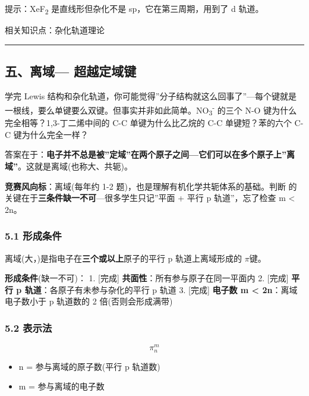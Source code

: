 \documentclass[a4paper,11pt]{ctexart}
\providecommand{\tightlist}{\setlength{\itemsep}{0pt}\setlength{\parskip}{0pt}}
\newcommand{\箭}{\ensuremath{\rightarrow}}
\newcommand{\左箭}{\ensuremath{\leftarrow}}
\newcommand{\上箭}{\ensuremath{\uparrow}}
\newcommand{\下箭}{\ensuremath{\downarrow}}
\newcommand{\衡}{\ensuremath{\rightleftharpoons}}
\newcommand{\双箭}{\ensuremath{\leftrightarrow}}
\newcommand{\约等于}{\ensuremath{\approx}}
\newcommand{\小于等于}{\ensuremath{\leq}}
\newcommand{\大于等于}{\ensuremath{\geq}}
\newcommand{\不等于}{\ensuremath{\neq}}
\newcommand{\西格马}{\ensuremath{\sigma}}
\newcommand{\派}{\ensuremath{\pi}}
\begin{document}
提示：XeF\textsubscript{2} 是直线形但杂化不是 sp，它在第三周期，用到了 d 轨道。

相关知识点：杂化轨道理论

\begin{center}\rule{0.5\linewidth}{0.5pt}\end{center}

\subsection{\texorpdfstring{五、离域 --- 超越定域键}{五、离域--- 超越定域键}}\label{ux4e94ux79bbux57df-ux8d85ux8d8aux5b9aux57dfux952e}

学完 Lewis 结构和杂化轨道，你可能觉得''分子结构就这么回事了''---每个键就是一根线，要么单键要么双键。但事实并非如此简单。NO\textsubscript{3}\textsuperscript{-} 的三个 N-O 键为什么完全相等？1,3-丁二烯中间的 C-C 单键为什么比乙烷的 C-C 单键短？苯的六个 C-C 键为什么完全一样？

答案在于：\textbf{电子并不总是被''定域''在两个原子之间---它们可以在多个原子上''离域''}。这就是离域(也称大、共轭)。

\textbf{竞赛风向标}：离域(每年约 1-2 题)，也是理解有机化学共轭体系的基础。判断  的关键在于\textbf{三条件缺一不可}---很多学生只记''平面 + 平行 p 轨道''，忘了检查 m \textless{} 2n。

\subsubsection{5.1 形成条件}\label{ux5f62ux6210ux6761ux4ef6}

离域(大，)是指电子在\textbf{三个或以上}原子的平行 p 轨道上离域形成的 \派 键。

\textbf{形成条件}(缺一不可)：
1. {[}完成{]} \textbf{共面性}：所有参与原子在同一平面内
2. {[}完成{]} \textbf{平行 p 轨道}：各原子有未参与杂化的平行 p 轨道
3. {[}完成{]} \textbf{电子数 m \textless{} 2n}：离域电子数小于 p 轨道数的 2 倍(否则会形成满带)

\subsubsection{\texorpdfstring{5.2  表示法}{5.2 表示法}}\label{ux8868ux793aux6cd5}

\[
\pi_n^m
\]

\begin{itemize}
\tightlist
\item
  n = 参与离域的原子数(平行 p 轨道数)
\item
  m = 参与离域的电子数
\end{itemize}
\end{document}
